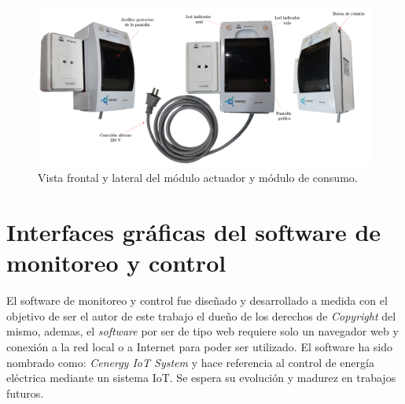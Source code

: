 \begin{landscape} %
\begin{figure}[htpb]
\centering 
\includegraphics[width=1.8\textwidth]{./Figures/consumo3.png}
\caption{Vista frontal y lateral del módulo actuador y módulo de consumo.}
\label{fig:modConsumo2}
\end{figure}
\end{landscape} %


\section{Interfaces gráficas del software de monitoreo y control}

El software de monitoreo y control fue diseñado y desarrollado a medida con el objetivo de ser el autor de este trabajo el dueño de los derechos de \emph{Copyright} del mismo, ademas, el \emph{software} por ser de tipo web requiere solo un navegador web y conexión a la red local o a Internet para poder ser utilizado. El software ha sido nombrado como: \emph{Cenergy IoT System} y hace referencia al control de energía eléctrica mediante un sistema IoT. Se espera su evolución y madurez en trabajos futuros. 


